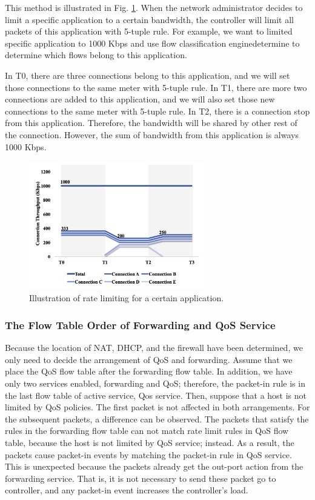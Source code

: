 \documentclass[conference]{IEEEtran}
\begin{document}
This method is illustrated in Fig. \ref{fig:mft_qos_rate_app}.
When the network administrator decides to limit a specific application to a certain bandwidth, the controller will limit all packets of this application with 5-tuple rule.
For example, we want to limited specific application to 1000 Kbps and use flow classification enginedetermine to determine which flows belong to this application.

In T0, there are three connections belong to this application, and we will set those connections to the same meter with 5-tuple rule.
In T1, there are more two connections are added to this application, and we will also set those new connections to the same meter with 5-tuple rule.
In T2, there is a connection stop from this application. Therefore, the bandwidth will be shared by other rest of the connection.
However, the sum of bandwidth from this application is always 1000 Kbps.

\begin{figure}[!t]
\centering
\includegraphics[width=3in]{./figures/mft_qos_rate_app}
\caption{Illustration of rate limiting for a certain application.}
\label{fig:mft_qos_rate_app}
\end{figure}

\subsubsection{The Flow Table Order of Forwarding and QoS Service}
Because the location of NAT, DHCP, and the firewall have been determined, we only need to decide the arrangement of QoS and forwarding. Assume that we place the QoS flow table after the forwarding flow table. In addition, we have only two services enabled, forwarding and QoS; therefore, the packet-in rule is in the last flow table of active service, Qos service. Then, suppose that a host is not limited by QoS policies. The first packet is not affected in both arrangements. For the subsequent packets, a difference can be observed. The packets that satisfy the rules in the forwarding flow table can not match rate limit rules in QoS flow table, because the host is not limited by QoS service; instead. As a result, the packets cause packet-in events by matching the packet-in rule in QoS service. This is unexpected because the packets already get the out-port action from the forwarding service. That is, it is not necessary to send these packet go to controller, and any packet-in event increases the controller’s load.
\end{document}
